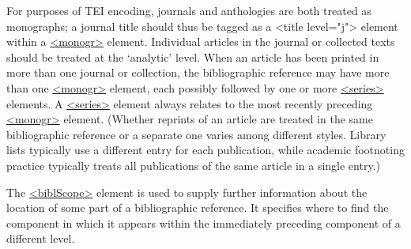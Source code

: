 For purposes of TEI encoding, journals and anthologies are both treated as monographs; a journal title should thus be tagged as a <title level="j"> element within a \hyperref[TEI.monogr]{<monogr>} element. Individual articles in the journal or collected texts should be treated at the ‘analytic’ level. When an article has been printed in more than one journal or collection, the bibliographic reference may have more than one \hyperref[TEI.monogr]{<monogr>} element, each possibly followed by one or more \hyperref[TEI.series]{<series>} elements. A \hyperref[TEI.series]{<series>} element always relates to the most recently preceding \hyperref[TEI.monogr]{<monogr>} element. (Whether reprints of an article are treated in the same bibliographic reference or a separate one varies among different styles. Library lists typically use a different entry for each publication, while academic footnoting practice typically treats all publications of the same article in a single entry.)\par
The \hyperref[TEI.biblScope]{<biblScope>} element is used to supply further information about the location of some part of a bibliographic reference. It specifies where to find the component in which it appears within the immediately preceding component of a different level.\par
